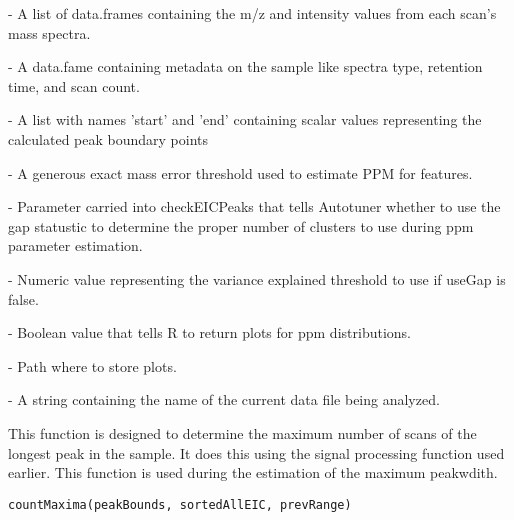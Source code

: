 \documentclass[a4paper]{book}
\begin{document}
%
\begin{Arguments}
\begin{ldescription}
\item[\code{mzDb}] - A list of data.frames containing the m/z and intensity values
from each scan's mass spectra.

\item[\code{header}] - A data.fame containing metadata on the sample like
spectra type, retention time, and scan count.

\item[\code{observedPeak}] - A list with names 'start' and 'end' containing
scalar values representing the calculated peak boundary points

\item[\code{massThresh}] - A generous exact mass error threshold used to estimate
PPM for features.

\item[\code{useGap}] - Parameter carried into checkEICPeaks that tells Autotuner
whether to use the gap statustic to determine the proper number of clusters
to use during ppm parameter estimation.

\item[\code{varExpThresh}] - Numeric value representing the variance explained
threshold to use if useGap is false.

\item[\code{returnPpmPlots}] - Boolean value that tells R to return plots for
ppm distributions.

\item[\code{plotDir}] - Path where to store plots.

\item[\code{filename}] - A string containing the name of the current data file being
analyzed.
\end{ldescription}
\end{Arguments}
%
\begin{Description}\relax
This function is designed to determine the maximum number of
scans of the longest peak in the sample. It does this using the signal
processing function used earlier. This function is used during the estimation
of the maximum peakwdith.
\end{Description}
%
\begin{Usage}
\begin{verbatim}
countMaxima(peakBounds, sortedAllEIC, prevRange)
\end{verbatim}
\end{Usage}
\end{document}
